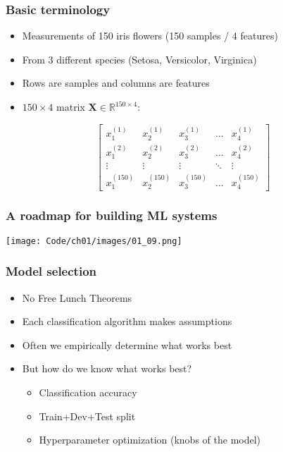 \documentclass{beamer}
\begin{document}
\begin{frame}
  \frametitle{Basic terminology}
  \begin{itemize}
  \item Measurements of 150 iris flowers (150 samples / 4 features)
  \item From 3 different species (Setosa, Versicolor, Virginica)
  \item Rows are samples and columns are features
  \item $150 \times 4$ matrix $\mathbf{X} \in \mathbb{R}^{150 \times 4}:$
  \end{itemize}

  \[
  \begin{bmatrix}
    x_{1}^{(1)} & x_{2}^{(1)} & x_{3}^{(1)} & \dots  & x_{4}^{(1)} \\
    x_{1}^{(2)} & x_{2}^{(2)} & x_{3}^{(2)} & \dots  & x_{4}^{(2)} \\
    \vdots & \vdots & \vdots & \ddots & \vdots \\
    x_{1}^{(150)} & x_{2}^{(150)} & x_{3}^{(150)} & \dots  & x_{4}^{(150)}
  \end{bmatrix}
  \]
\end{frame}

\begin{frame}
  \frametitle{A roadmap for building ML systems}
  \texttt{[image: Code/ch01/images/01\_09.png]}
\end{frame}

\begin{frame}
  \frametitle{Model selection}
  \begin{itemize}
  \item No Free Lunch Theorems
  \item Each classification algorithm makes assumptions
  \item Often we empirically determine what works best
  \item But how do we know what works best?
    \begin{itemize}
    \item Classification accuracy
    \item Train+Dev+Test split
    \item Hyperparameter optimization (knobs of the model)
    \end{itemize}
  \end{itemize}
\end{frame}
\end{document}
